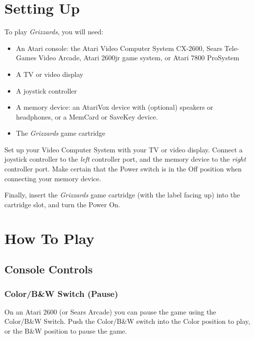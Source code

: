 \documentclass[12pt,openright,book]{memoir}
\begin{document}
\cleardoublepage

\tableofcontents

\chapter{Setting Up}\label{Setting Up}

To play \textit{Grizzards}, you will need:

\begin{itemize}
\item An Atari  console: the Atari Video Computer  System CX-2600, Sears
  Tele-Games  Video Arcade,  Atari  2600jr game  system,  or Atari  7800
  ProSystem
\item A TV or video display
\item A joystick controller
\item A  memory device: an  AtariVox device with (optional)  speakers or
  headphones, or a MemCard or SaveKey device.
\item The \textit{Grizzards} game cartridge
\end{itemize}

Set  up your  Video  Computer  System with  your  TV  or video  display.
Connect a  joystick controller to  the \emph{left} controller  port, and
the memory device to the \emph{right} controller port. Make certain that
the  Power  switch   is  in  the  Off  position   when  connecting  your
memory device.

Finally, insert  the \textit{Grizzards}  game cartridge (with  the label
facing up) into the cartridge slot, and turn the Power On.

\chapter{How To Play}

\section{Console Controls}

\ifdefined\TVSECAM
\else

\subsection{Color/B\&W Switch (Pause)}

On an  Atari 2600  (or Sears Arcade)  you can pause  the game  using the
Color/B\&W Switch. Push the Color/B\&W switch into the Color position to
play, or the B\&W position to pause the game.
\end{document}
